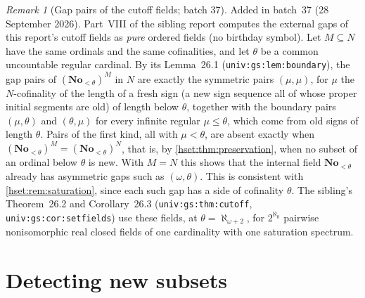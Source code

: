 \documentclass[11pt,letterpaper]{article}
\theoremstyle{definition}
\theoremstyle{remark}
\newtheorem{remark}[remark]{Remark}\aliascntresetthe{remark}
\newcommand{\No}{\mathbf{No}}
\newcommand{\cf}{\operatorname{cf}}
\newcommand{\lbl}[1]{\nolinkurl{#1}}
\newcommand{\repo}[1]{\nolinkurl{#1}}
\begin{document}
\begin{remark}[Gap pairs of the cutoff fields; batch 37]\label{hset:rem:cutoffgaps}
Added in batch~37 (28 September 2026). Part~VIII of the sibling report computes
the external gaps of this report's cutoff fields as \emph{pure} ordered fields
(no birthday symbol). Let $M\subseteq N$ have the same ordinals and the same
cofinalities, and let $\theta$ be a common uncountable regular cardinal. By its
Lemma~26.1 (\lbl{univ:gs:lem:boundary}), the gap pairs of $(\No_{<\theta})^M$ in
$N$ are exactly the symmetric pairs $(\mu,\mu)$, for $\mu$ the $N$-cofinality of
the length of a fresh sign (a new sign sequence all of whose proper initial
segments are old) of length below $\theta$, together with the boundary pairs
$(\mu,\theta)$ and $(\theta,\mu)$ for every infinite regular $\mu\le\theta$, which
come from old signs of length $\theta$. Pairs of the first kind, all with
$\mu<\theta$, are absent exactly when $(\No_{<\theta})^M=(\No_{<\theta})^N$, that is, by
\cref{hset:thm:preservation}, when no subset of an ordinal below $\theta$ is new.
With $M=N$ this shows that the internal field $\No_{<\theta}$ already has
asymmetric gaps such as $(\omega,\theta)$. This is consistent with
\cref{hset:rem:saturation}, since each such gap has a side of cofinality
$\theta$. The sibling's Theorem~26.2 and Corollary~26.3 (\lbl{univ:gs:thm:cutoff},
\lbl{univ:gs:cor:setfields}) use these fields, at $\theta=\aleph_{\omega+2}$, for
$2^{\aleph_0}$ pairwise nonisomorphic real closed fields of one cardinality with
one saturation spectrum.
\end{remark}

\noindent[Added 3 October 2026, batch~81: the case $M=N$ holds for every
infinite cardinal. Source~17 of the report
\repo{foundations-and-computation/surreal-well-orders} computes the gap pairs
of the ordered set $\No_{<\theta}$ for every infinite cardinal $\theta$,
including singular $\theta$ and $\theta=\omega$: with $r=\cf\theta$ they are
$(r,r)$ and $(\rho,r)$, $(r,\rho)$ for every infinite regular $\rho<\theta$, and
deleting fewer than $2^{<\theta}$ points does not change them (its
Theorem~29.4, \lbl{swo:gs:thm:alphabet-gaps}, with the same witnesses, $\rho$ pluses followed by $\theta$
minuses). At uncountable regular $\theta$ this is the case
$M=N$ of \lbl{univ:gs:lem:boundary} above, which that report records with a
pointer.]

\section{Detecting new subsets}
\label{hset:sec:detectors}
\end{document}
